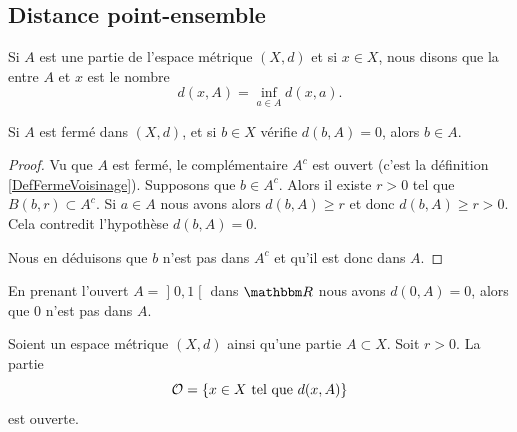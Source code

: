 \subsection{Distance point-ensemble}

\begin{definition}
	Si $A$ est une partie de l'espace métrique $(X,d)$ et si $x\in X$, nous disons que la  entre $A$ et $x$ est le nombre
	\begin{equation}		\label{EqdefDistaA}
		d(x,A)=\inf_{a\in A}d(x,a).
	\end{equation}
\end{definition}
\newcommand{\CaptionFigDistanceEnsemble}{La distance entre $x$ et $A$ est donnée par la distance entre $x$ et $p$. Les distances entre $x$ et les autres points de $A$ sont plus grandes que $d(x,p)$.}


\begin{lemma}        \label{LEMooAIARooQADaxM}
    Si \( A\) est fermé dans \( (X,d)\), et si \( b\in X\) vérifie \( d(b,A)=0\), alors \( b\in A\).
\end{lemma}

\begin{proof}
    Vu que \( A\) est fermé, le complémentaire \( A^c\) est ouvert (c'est la définition \ref{DefFermeVoisinage}). Supposons que \( b\in A^c\). Alors il existe \( r>0\) tel que \( B(b,r)\subset A^c\). Si \( a\in A\) nous avons alors \( d(b,A)\geq r\) et donc \( d(b,A)\geq r>0\). Cela contredit l'hypothèse \( d(b,A)=0\).

    Nous en déduisons que \( b\) n'est pas dans \( A^c\) et qu'il est donc dans \( A\).
\end{proof}


\begin{example}
    En prenant l'ouvert \( A=\mathopen] 0 , 1 \mathclose[\) dans \( \eR\) nous avons \( d(0,A)=0\), alors que \( 0\) n'est pas dans \( A\).
\end{example}

\begin{lemma}    \label{LEMooJNRTooZyKiFC}
    Soient un espace métrique \( (X,d)\) ainsi qu'une partie \( A\subset X\). Soit \( r>0\). La partie
    \begin{equation}
        \mathcal{O}=\{ x\in X\text{ tel que } d(x,A) \}
    \end{equation}
    est ouverte.
\end{lemma}

